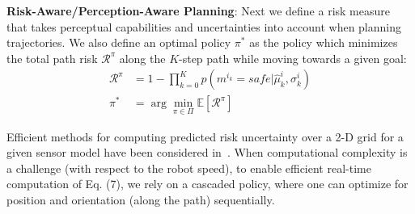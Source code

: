 \documentclass[letterpaper, 10pt, conference]{ieeeconf}      %
\newcommand{\ph}[1]{{\textbf{#1}:}} %
\newcommand{\rev}[1]{{\color{blue}#1}} %
\begin{document}
\ph{Risk-Aware/Perception-Aware Planning}
Next we define a risk measure that takes perceptual capabilities and uncertainties into account when planning trajectories.  We also define an optimal policy $\pi^*$ as the policy which minimizes the total path risk $\mathcal{R}^\pi$ along the $K$-step path while \rev{moving towards a given goal}:
\begin{align}
 \mathcal{R}^{\pi} &= 1 - \prod_{k=0}^K p(m^{i_k}=safe | \hat{\mu}_k^{i},\sigma_k^{i})
 \label{eq:risk}\\
 \pi^* &= \arg\min_{\pi\in\Pi}\mathbb{E}[\mathcal{R}^{\pi}]
 \label{eq:policy}
\end{align}

Efficient methods for computing predicted risk uncertainty over a 2-D grid for a given sensor model have been considered in~\cite{heiden2017planning}.
\rev{When computational complexity is a challenge (with respect to the robot speed), to  enable  efficient  real-time  computation  of  Eq.  (7),  we  rely  on  a  cascaded  policy,  where one can optimize for position and orientation (along the path) sequentially.}



\end{document}
